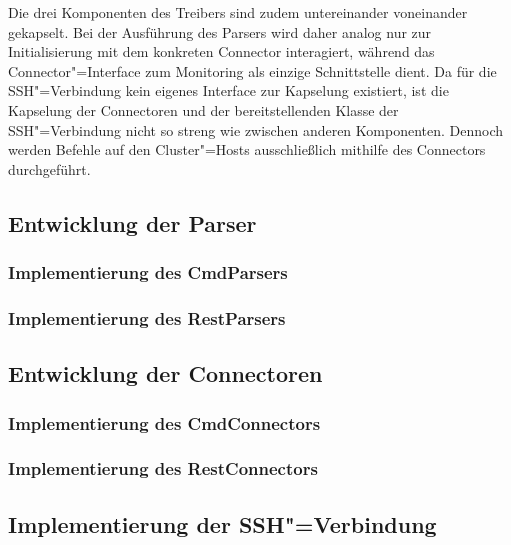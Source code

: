 Die drei Komponenten des Treibers sind zudem untereinander  voneinander gekapselt.
Bei der Ausführung des Parsers wird daher analog nur zur Initialisierung mit dem konkreten Connector interagiert, während das Connector"=Interface zum Monitoring als einzige Schnittstelle dient.
Da für die SSH"=Verbindung kein eigenes Interface zur Kapselung existiert, ist die Kapselung der Connectoren und der bereitstellenden Klasse der SSH"=Verbindung nicht so streng wie zwischen anderen Komponenten.
Dennoch werden Befehle auf den Cluster"=Hosts ausschließlich mithilfe des Connectors durchgeführt.

\subsection{Entwicklung der Parser}
\label{subsec:implementedParsers}

\subsubsection{Implementierung des CmdParsers}
\label{subsubsec:implCmdParser}

\subsubsection{Implementierung des RestParsers}
\label{subsubsec:implRestParser}

\subsection{Entwicklung der Connectoren}
\label{subsec:implementedConnectors}

\subsubsection{Implementierung des CmdConnectors}
\label{subsubsec:implCmdConnector}

\subsubsection{Implementierung des RestConnectors}
\label{subsubsec:implRestConnector}

\subsection{Implementierung der SSH"=Verbindung}
\label{subsec:sshConnection}


